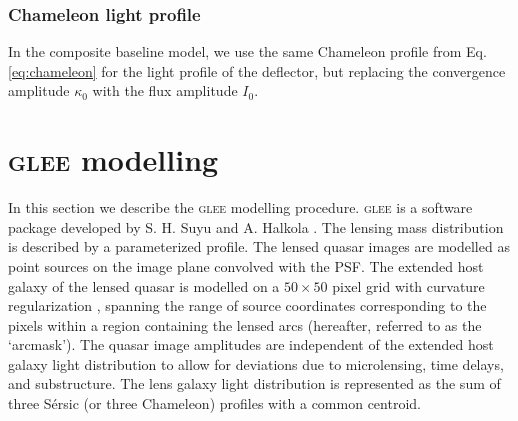 \documentclass[longauth]{aa}
\newcommand{\ajsiii}[1]{{{#1}}}
\begin{document}
\subsubsection{Chameleon light profile}
In the composite baseline model, we use the same Chameleon profile from Eq. \ref{eq:chameleon} for the light profile of the deflector, but replacing the convergence amplitude $\kappa_0$ with the flux amplitude $I_0$.

\section{\textsc{glee} modelling} \label{sec:glee_modelling}

In this section we describe the \textsc{glee} modelling procedure.  \textsc{glee} is a software package developed by S. H. Suyu and A. Halkola \citep{Suyu10b,Suyu12c}.  The lensing mass distribution is described by a parameterized profile.  The lensed quasar images are modelled as point sources on the image plane convolved with the PSF.  The extended host galaxy of the \ajsiii{lensed quasar} is modelled on a $50\times50$ pixel grid with curvature regularization \citep{Suyu06}, spanning the range of source coordinates corresponding to the pixels within \ajsiii{a region containing the lensed arcs (hereafter, referred to as the `arcmask')}.  The quasar image amplitudes are independent of the extended host galaxy light distribution to allow for deviations due to microlensing, time delays, and substructure. The lens galaxy light distribution is represented as the sum of three S\'{e}rsic (or three Chameleon) profiles with a common centroid.
\end{document}
